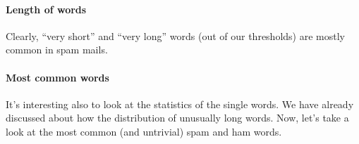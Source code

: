 \paragraph{Length of words}
Clearly, ``very short'' and ``very long'' words (out of our thresholds) are mostly common in spam mails.

\paragraph{Most common words}
It's interesting also to look at the statistics of the single words. We have already discussed about how the distribution of unusually long words. Now, let's take a look at the most common (and untrivial) spam and ham words.
